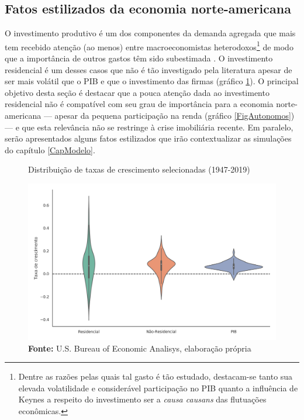 \subsection{Fatos estilizados da economia norte-americana}\label{FatosEUA}

O investimento produtivo é um dos componentes da demanda agregada que mais tem recebido atenção (ao menos) entre macroeconomistas heterodoxos\footnote{Dentre as razões pelas quais tal gasto é tão estudado, destacam-se tanto sua elevada volatilidade e considerável participação no PIB quanto a influência de Keynes a respeito do investimento ser a \textit{causa causans} das flutuações econômicas.} de modo que a importância de outros gastos têm sido subestimada \cite{brochier_macroeconomics_2017}.
O investimento residencial é um desses casos que não é tão investigado pela literatura apesar de ser mais volátil que o PIB e que o investimento das firmas (gráfico \ref{FigVolatilidade}).
O principal objetivo desta seção é destacar que a pouca atenção dada ao investimento residencial não é compatível com seu grau de importância  para a economia norte-americana ---  apesar da pequena participação na renda (gráfico \ref{FigAutonomos}) --- e que esta relevância não se restringe à crise imobiliária recente.
Em paralelo, serão apresentados alguns fatos estilizados que irão contextualizar as simulações do capítulo \ref{CapModelo}.




\begin{figure}[H]
	\centering
	\caption{Distribuição de taxas de crescimento selecionadas (1947-2019)}
	\label{FigVolatilidade}
	\includegraphics[width=\textwidth]{../../Dados/Fatos_Estilizados/figs/Volatilidade.png}
	\caption*{\textbf{Fonte:} U.S. Bureau of Economic Analisys, elaboração própria}
\end{figure}


